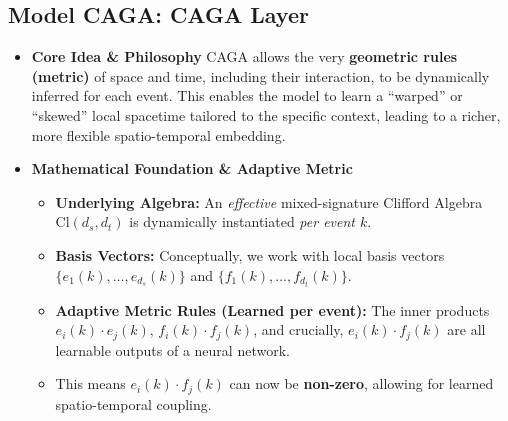 \documentclass[11pt]{article}
\newcommand{\Cl}[2]{\text{Cl}(#1, #2)} %
\newenvironment{modeldescription}[1]{%
    \subsection*{Model #1: \MakeUppercase{#1} Layer}%
    \begin{itemize}[leftmargin=*,noitemsep]%
}{%
    \end{itemize}%
}
\begin{document}
\begin{modeldescription}{CAGA}
    \item \textbf{Core Idea \& Philosophy}
    CAGA allows the very \textbf{geometric rules (metric)} of space and time, including their interaction, to be dynamically inferred for each event. This enables the model to learn a ``warped'' or ``skewed'' local spacetime tailored to the specific context, leading to a richer, more flexible spatio-temporal embedding.

    \item \textbf{Mathematical Foundation \& Adaptive Metric}
    \begin{itemize}[noitemsep]
        \item \textbf{Underlying Algebra:} An \textit{effective} mixed-signature Clifford Algebra $\Cl{d_s}{d_t}$ is dynamically instantiated \textit{per event $k$}.
        \item \textbf{Basis Vectors:} Conceptually, we work with local basis vectors $\{e_1(k), \dots, e_{d_s}(k)\}$ and $\{f_1(k), \dots, f_{d_t}(k)\}$.
        \item \textbf{Adaptive Metric Rules (Learned per event):} The inner products $e_i(k) \cdot e_j(k)$, $f_i(k) \cdot f_j(k)$, and crucially, $e_i(k) \cdot f_j(k)$ are all learnable outputs of a neural network.
            \item This means $e_i(k) \cdot f_j(k)$ can now be \textbf{non-zero}, allowing for learned spatio-temporal coupling.
    \end{itemize}


\end{modeldescription}
\end{document}
